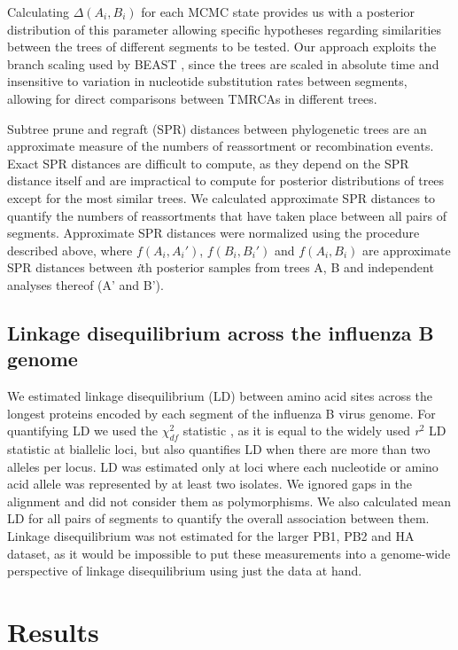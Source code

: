 \documentclass[11pt,oneside,letterpaper]{article}
\begin{document}
Calculating $\Delta(A_i, B_i)$ for each MCMC state provides us with a posterior distribution of this parameter allowing  specific hypotheses regarding similarities between the trees of different segments to be tested.
Our approach exploits the branch scaling used by BEAST \cite{drummond2012}, since the trees are scaled in absolute time and insensitive to variation in nucleotide substitution rates between segments, allowing for direct comparisons between TMRCAs in different trees.

Subtree prune and regraft (SPR) distances between phylogenetic trees are an approximate measure of the numbers of reassortment or recombination events.
Exact SPR distances are difficult to compute, as they depend on the SPR distance itself and are impractical to compute for posterior distributions of trees except for the most similar trees.
We calculated approximate SPR distances \cite{whidden2009,whidden2010,whidden2013} to quantify the numbers of reassortments that have taken place between all pairs of segments.
Approximate SPR distances were normalized using the procedure described above, where $f(A_i, A_i')$, $f(B_i, B_i')$ and $f(A_i, B_i)$ are approximate SPR distances between \textit{i}th posterior samples from trees A, B and independent analyses thereof (A' and B').

\subsection*{Linkage disequilibrium across the influenza B genome}
We estimated linkage disequilibrium (LD) between amino acid sites across the longest proteins encoded by each segment of the influenza B virus genome.
For quantifying LD we used the $\chi^{2}_{df}$ statistic \cite{zhao2005}, as it is equal to the widely used \textit{r$^{2}$} LD statistic at biallelic loci, but also quantifies LD when there are more than two alleles per locus.
LD was estimated only at loci where each nucleotide or amino acid allele was represented by at least two isolates.
We ignored gaps in the alignment and did not consider them as polymorphisms.
We also calculated mean LD for all pairs of segments to quantify the overall association between them.
Linkage disequilibrium was not estimated for the larger PB1, PB2 and HA dataset, as it would be impossible to put these measurements into a genome-wide perspective of linkage disequilibrium using just the data at hand.

\section*{Results}
\end{document}
